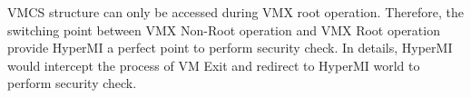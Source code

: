 \documentclass[conference]{IEEEtran}
\begin{document}
VMCS structure can only be accessed during VMX root operation. Therefore, the switching point between VMX Non-Root operation and VMX Root operation provide HyperMI a perfect point to perform security check. In details, HyperMI would intercept the process of VM Exit and redirect to HyperMI world to perform security check. 
%
%
%
\end{document}
